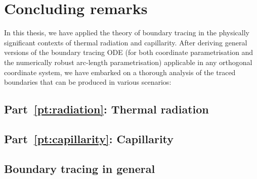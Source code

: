 \chapter{Concluding remarks}
\label{ch:concluding}

In this thesis,
we have applied the theory of boundary tracing
in the physically significant contexts
of thermal radiation and capillarity.
After deriving general versions of the boundary tracing ODE
(for both coordinate parametrisation
and the numerically robust arc-length parametrisation)
applicable in any orthogonal coordinate system,
we have embarked on a thorough analysis
of the traced boundaries that can be produced in various scenarios:

\section{Part~\ref*{pt:radiation}: Thermal radiation}
\label{sec:concluding.radiation}

\section{Part~\ref*{pt:capillarity}: Capillarity}
\label{sec:concluding.capillarity}

\section{Boundary tracing in general}
\label{sec:concluding.tracing}
